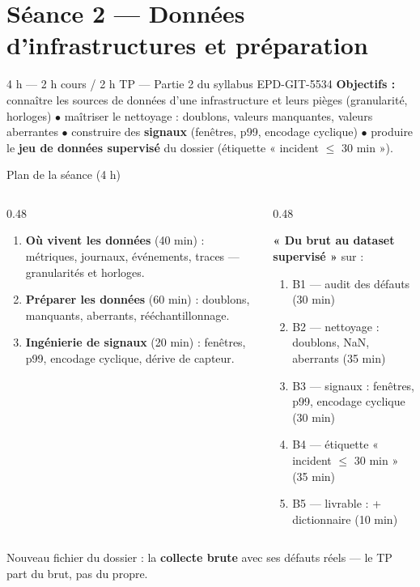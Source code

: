 \section{Séance 2 --- Données d'infrastructures et préparation}
{4 h --- 2 h cours / 2 h TP --- Partie 2 du syllabus EPD-GIT-5534}
{\textbf{Objectifs :} connaître les sources de données d'une infrastructure et
leurs pièges (granularité, horloges) $\bullet$ maîtriser le nettoyage :
doublons, valeurs manquantes, valeurs aberrantes $\bullet$ construire des
\textbf{signaux} (fenêtres, p99, encodage cyclique) $\bullet$ produire le
\textbf{jeu de données supervisé} du dossier (étiquette « incident $\le$ 30 min »).}

\begin{frame}{Plan de la séance (4 h)}
\begin{columns}[t]
\begin{column}{0.48\textwidth}
\begin{kbox}
\begin{enumerate}
\item \textbf{Où vivent les données} (40 min) : métriques, journaux, événements,
traces --- granularités et horloges.
\item \textbf{Préparer les données} (60 min) : doublons, manquants, aberrants,
rééchantillonnage.
\item \textbf{Ingénierie de signaux} (20 min) : fenêtres, p99, encodage cyclique,
dérive de capteur.
\end{enumerate}
\end{kbox}
\end{column}
\begin{column}{0.48\textwidth}
\begin{ebox}
\textbf{« Du brut au dataset supervisé »} sur  :
\begin{enumerate}
\item B1 --- audit des défauts (30 min)
\item B2 --- nettoyage : doublons, NaN, aberrants (35 min)
\item B3 --- signaux : fenêtres, p99, encodage cyclique (30 min)
\item B4 --- étiquette « incident $\le$ 30 min » (35 min)
\item B5 --- livrable :  + dictionnaire (10 min)
\end{enumerate}
\end{ebox}
\end{column}
\end{columns}
\vspace{1mm}
\begin{center}\small
Nouveau fichier du dossier : la \textbf{collecte brute} avec ses défauts réels ---
le TP part du brut, pas du propre.
\end{center}
\end{frame}

